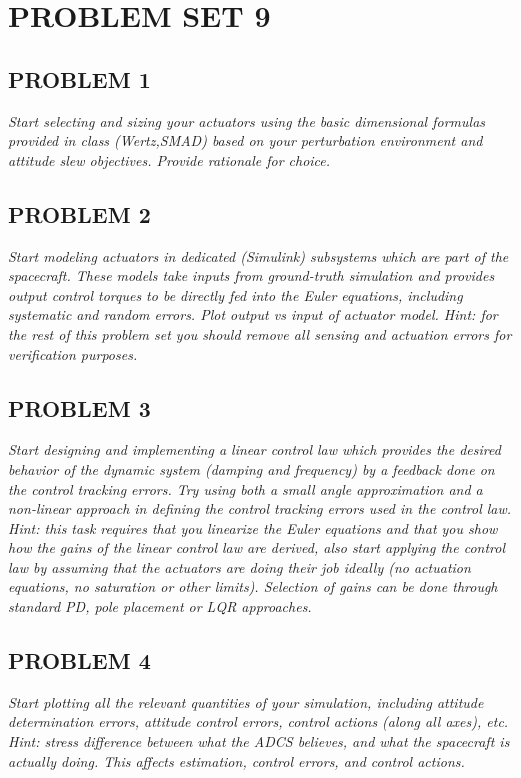 \section{\Large PROBLEM SET 9}
\subsection{PROBLEM 1}
\textit{Start selecting and sizing your actuators using the basic dimensional formulas provided in class (Wertz,SMAD) based on your perturbation environment and attitude slew objectives. Provide rationale for choice.}

\subsection{PROBLEM 2}
\textit{Start modeling actuators in dedicated (Simulink) subsystems which are part of the spacecraft. These models take inputs from ground-truth simulation and provides output control torques to be directly fed into the Euler equations, including systematic and random errors. Plot output vs input of actuator model. Hint: for the rest of this problem set you should remove all sensing and actuation errors for verification purposes.}

\subsection{PROBLEM 3}
\textit{Start designing and implementing a linear control law which provides the desired behavior of the dynamic system (damping and frequency) by a feedback done on the control tracking errors. Try using both a small angle approximation and a non-linear approach in defining the control tracking errors used in the control law. Hint: this task requires that you linearize the Euler equations and that you show how the gains of the linear control law are derived, also start applying the control law by assuming that the actuators are doing their job ideally (no actuation equations, no saturation or other limits). Selection of gains can be done through standard PD, pole placement or LQR approaches.}

\subsection{PROBLEM 4}
\textit{Start plotting all the relevant quantities of your simulation, including attitude determination errors, attitude control errors, control actions (along all axes), etc. Hint: stress difference between what the ADCS believes, and what the spacecraft is actually doing. This affects estimation, control errors, and control actions.}